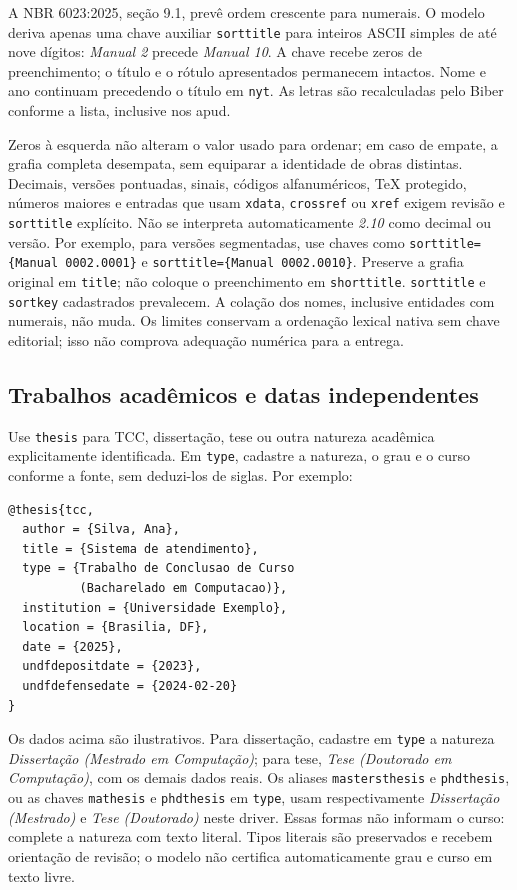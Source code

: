 A NBR 6023:2025, seção 9.1, prevê ordem crescente para numerais.
O modelo deriva apenas uma chave auxiliar \texttt{sorttitle} para inteiros
ASCII simples de até nove dígitos: \emph{Manual 2} precede \emph{Manual 10}.
A chave recebe zeros de preenchimento; o título e o rótulo apresentados
permanecem intactos. Nome e ano continuam precedendo o título em \texttt{nyt}.
As letras são recalculadas pelo Biber conforme a lista, inclusive nos apud.

Zeros à esquerda não alteram o valor usado para ordenar; em caso de empate,
a grafia completa desempata, sem equiparar a identidade de obras distintas.
Decimais, versões pontuadas, sinais, códigos alfanuméricos,
TeX protegido, números maiores e entradas que usam \texttt{xdata},
\texttt{crossref} ou \texttt{xref} exigem revisão e \texttt{sorttitle} explícito.
Não se interpreta automaticamente \emph{2.10} como decimal ou versão.
Por exemplo, para versões segmentadas, use chaves como
\verb|sorttitle={Manual 0002.0001}| e \verb|sorttitle={Manual 0002.0010}|.
Preserve a grafia original em \texttt{title}; não coloque o preenchimento
em \texttt{shorttitle}. \texttt{sorttitle} e \texttt{sortkey} cadastrados
prevalecem. A colação dos nomes, inclusive entidades com numerais, não muda.
Os limites conservam a ordenação lexical nativa sem chave editorial;
isso não comprova adequação numérica para a entrega.

\subsection*{Trabalhos acadêmicos e datas independentes}

Use \texttt{thesis} para TCC, dissertação, tese ou outra natureza acadêmica
explicitamente identificada. Em \texttt{type}, cadastre a natureza, o grau e
o curso conforme a fonte, sem deduzi-los de siglas. Por exemplo:
\begin{samepage}
\begin{verbatim}
@thesis{tcc,
  author = {Silva, Ana},
  title = {Sistema de atendimento},
  type = {Trabalho de Conclusao de Curso
          (Bacharelado em Computacao)},
  institution = {Universidade Exemplo},
  location = {Brasilia, DF},
  date = {2025},
  undfdepositdate = {2023},
  undfdefensedate = {2024-02-20}
}
\end{verbatim}
\end{samepage}
Os dados acima são ilustrativos. Para dissertação, cadastre em \texttt{type}
a natureza \emph{Dissertação (Mestrado em Computação)}; para tese,
\emph{Tese (Doutorado em Computação)}, com os demais dados reais.
Os aliases \texttt{mastersthesis} e \texttt{phdthesis}, ou as chaves
\texttt{mathesis} e \texttt{phdthesis} em \texttt{type}, usam respectivamente
\emph{Dissertação (Mestrado)} e \emph{Tese (Doutorado)} neste driver.
Essas formas não informam o curso: complete a natureza com texto literal.
Tipos literais são preservados e recebem orientação de revisão;
o modelo não certifica automaticamente grau e curso em texto livre.

